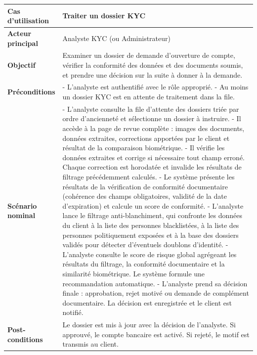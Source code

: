 \begin{longtable}{|>{\bfseries}p{3.8cm}|p{10.2cm}|}
  \hline
  Cas d'utilisation    & Traiter un dossier KYC \\
  \hline
  Acteur principal     & Analyste KYC (ou Administrateur) \\
  \hline
  Objectif             & Examiner un dossier de demande d'ouverture de compte, vérifier la conformité des données et des documents soumis, et prendre une décision sur la suite à donner à la demande. \\
  \hline
  Préconditions        &
    - L'analyste est authentifié avec le rôle approprié. \newline
    - Au moins un dossier KYC est en attente de traitement dans la file. \\
  \hline
  Scénario nominal     &
    - L'analyste consulte la file d'attente des dossiers triée par ordre d'ancienneté et sélectionne un dossier à instruire. \newline
    - Il accède à la page de revue complète : images des documents, données extraites, corrections apportées par le client et résultat de la comparaison biométrique. \newline
    - Il vérifie les données extraites et corrige si nécessaire tout champ erroné. Chaque correction est horodatée et invalide les résultats de filtrage précédemment calculés. \newline
    - Le système présente les résultats de la vérification de conformité documentaire (cohérence des champs obligatoires, validité de la date d'expiration) et calcule un score de conformité. \newline
    - L'analyste lance le filtrage anti-blanchiment, qui confronte les données du client à la liste des personnes blacklistées, à la liste des personnes politiquement exposées et à la base des dossiers validés pour détecter d'éventuels doublons d'identité. \newline
    - L'analyste consulte le score de risque global agrégeant les résultats du filtrage, la conformité documentaire et la similarité biométrique. Le système formule une recommandation automatique. \newline
    - L'analyste prend sa décision finale : approbation, rejet motivé ou demande de complément documentaire. La décision est enregistrée et le client est notifié. \\
  \hline
  Post-conditions      & Le dossier est mis à jour avec la décision de l'analyste. Si approuvé, le compte bancaire est activé. Si rejeté, le motif est transmis au client. \\

\end{longtable}
